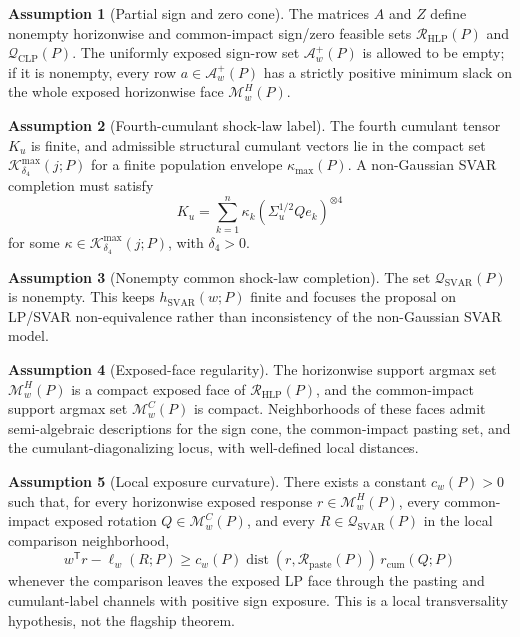 \documentclass[11pt]{article}
\newcommand{\transpose}{\mathsf{T}}
\theoremstyle{definition}
\newtheorem{assumption}{Assumption}
\theoremstyle{plain}
\theoremstyle{remark}
\begin{document}
\begin{assumption}[Partial sign and zero cone]\label{ass:sign-cone}
The matrices \(A\) and \(Z\) define nonempty horizonwise and common-impact sign/zero feasible sets \(\mathcal R_{\mathrm{HLP}}(P)\) and \(\mathcal Q_{\mathrm{CLP}}(P)\).  The uniformly exposed sign-row set \(\mathcal A_w^+(P)\) is allowed to be empty; if it is nonempty, every row \(a\in\mathcal A_w^+(P)\) has a strictly positive minimum slack on the whole exposed horizonwise face \(\mathcal M_w^H(P)\).
\end{assumption}

\begin{assumption}[Fourth-cumulant shock-law label]\label{ass:cumulant-label}
The fourth cumulant tensor \(K_u\) is finite, and admissible structural cumulant vectors lie in the compact set \(\mathcal K_{\delta_4}^{\max}(j;P)\) for a finite population envelope \(\kappa_{\max}(P)\).  A non-Gaussian SVAR completion must satisfy
\[
K_u=\sum_{k=1}^n\kappa_k(\Sigma_u^{1/2}Qe_k)^{\otimes4}
\]
for some \(\kappa\in\mathcal K_{\delta_4}^{\max}(j;P)\), with \(\delta_4>0\).
\end{assumption}

\begin{assumption}[Nonempty common shock-law completion]\label{ass:nonempty-svar}
The set \(\mathcal Q_{\mathrm{SVAR}}(P)\) is nonempty.  This keeps \(h_{\mathrm{SVAR}}(w;P)\) finite and focuses the proposal on LP/SVAR non-equivalence rather than inconsistency of the non-Gaussian SVAR model.
\end{assumption}

\begin{assumption}[Exposed-face regularity]\label{ass:exposed-face}
The horizonwise support argmax set \(\mathcal M_w^H(P)\) is a compact exposed face of \(\mathcal R_{\mathrm{HLP}}(P)\), and the common-impact support argmax set \(\mathcal M_w^C(P)\) is compact.  Neighborhoods of these faces admit semi-algebraic descriptions for the sign cone, the common-impact pasting set, and the cumulant-diagonalizing locus, with well-defined local distances.
\end{assumption}

\begin{assumption}[Local exposure curvature]\label{ass:curvature}
There exists a constant \(c_w(P)>0\) such that, for every horizonwise exposed response \(r\in\mathcal M_w^H(P)\), every common-impact exposed rotation \(Q\in\mathcal M_w^C(P)\), and every \(R\in\mathcal Q_{\mathrm{SVAR}}(P)\) in the local comparison neighborhood,
\[
w^\transpose r-\ell_w(R;P)\ge c_w(P)\operatorname{dist}(r,\mathcal R_{\mathrm{paste}}(P))\,r_{\mathrm{cum}}(Q;P)
\]
whenever the comparison leaves the exposed LP face through the pasting and cumulant-label channels with positive sign exposure.  This is a local transversality hypothesis, not the flagship theorem.
\end{assumption}
\end{document}
